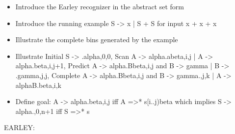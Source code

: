 %
\begin{isabellebody}%
%
%
\isadelimtheory
%
\endisadelimtheory
%
\isatagtheory
%
\endisatagtheory
{\isafoldtheory}%
%
\isadelimtheory
%
\endisadelimtheory
%
\isadelimdocument
%
\endisadelimdocument
%
\isatagdocument
%
\isamarkuptrue%
%
\isamarkuptrue%
%
\endisatagdocument
{\isafolddocument}%
%
\isadelimdocument
%
\endisadelimdocument
%
\begin{isamarkuptext}%
\begin{itemize}
    \item Introduce the Earley recognizer in the abstract set form \\
    \item Introduce the running example S -> x | S + S for input x + x + x \\
    \item Illustrate the complete bins generated by the example \\
    \item Illustrate Initial S -> .alpha,0,0, Scan A -> alpha.abeta,i,j | A -> alpha.beta,i,j+1,
      Predict A -> alpha.Bbeta,i,j and B -> gamma | B -> .gamma,j,j,
      Complete A -> alpha.Bbeta,i,j and B -> gamma.,j,k | A -> alphaB.beta,i,k \\
    \item Define goal: A -> alpha.beta,i,j iff A =>* s[i..j)beta which implies S -> alpha.,0,n+1 iff S =>* s \\
  \end{itemize}%
\end{isamarkuptext}\isamarkuptrue%
%
\isadelimdocument
%
\endisadelimdocument
%
\isatagdocument
%
\isamarkuptrue%
%
\endisatagdocument
{\isafolddocument}%
%
\isadelimdocument
%
\endisadelimdocument
%
\begin{isamarkuptext}%
EARLEY:


\end{isamarkuptext}
\end{isabellebody}
